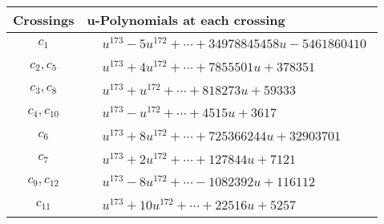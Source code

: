 \documentclass[1p]{elsarticle_modified}
\theoremstyle{definition}
\begin{document}
\begin{tabular}{m{50pt}|m{274pt}}
Crossings & \hspace{64pt}u-Polynomials at each crossing \\
\hline $$\begin{aligned}c_{1}\end{aligned}$$&$\begin{aligned}
&u^{173}-5 u^{172}+\cdots+34978845458 u-5461860410
\end{aligned}$\\
\hline $$\begin{aligned}c_{2},c_{5}\end{aligned}$$&$\begin{aligned}
&u^{173}+4 u^{172}+\cdots+7855501 u+378351
\end{aligned}$\\
\hline $$\begin{aligned}c_{3},c_{8}\end{aligned}$$&$\begin{aligned}
&u^{173}+u^{172}+\cdots+818273 u+59333
\end{aligned}$\\
\hline $$\begin{aligned}c_{4},c_{10}\end{aligned}$$&$\begin{aligned}
&u^{173}- u^{172}+\cdots+4515 u+3617
\end{aligned}$\\
\hline $$\begin{aligned}c_{6}\end{aligned}$$&$\begin{aligned}
&u^{173}+8 u^{172}+\cdots+725366244 u+32903701
\end{aligned}$\\
\hline $$\begin{aligned}c_{7}\end{aligned}$$&$\begin{aligned}
&u^{173}+2 u^{172}+\cdots+127844 u+7121
\end{aligned}$\\
\hline $$\begin{aligned}c_{9},c_{12}\end{aligned}$$&$\begin{aligned}
&u^{173}-8 u^{172}+\cdots-1082392 u+116112
\end{aligned}$\\
\hline $$\begin{aligned}c_{11}\end{aligned}$$&$\begin{aligned}
&u^{173}+10 u^{172}+\cdots+22516 u+5257
\end{aligned}$\\
\hline
\end{tabular}\\~\\
\end{document}
